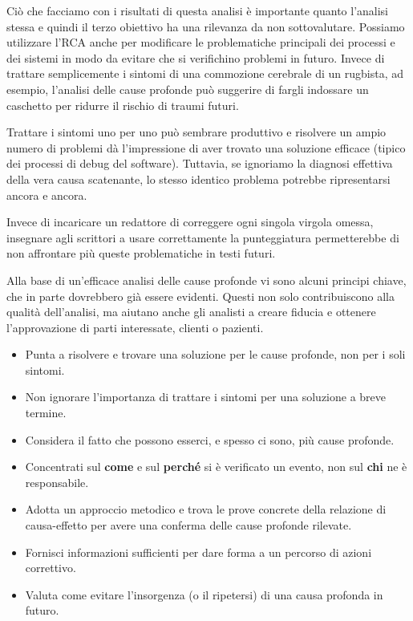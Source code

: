 Ciò che facciamo con i risultati di questa analisi è importante quanto l'analisi stessa e quindi il terzo obiettivo ha una rilevanza da non sottovalutare. Possiamo utilizzare l'RCA anche per modificare le problematiche principali dei processi e dei sistemi in modo da evitare che si verifichino problemi in futuro. Invece di trattare semplicemente i sintomi di una commozione cerebrale di un rugbista, ad esempio, l'analisi delle cause profonde può suggerire di fargli indossare un caschetto per ridurre il rischio di traumi futuri.

Trattare i sintomi uno per uno può sembrare produttivo e risolvere un ampio numero di problemi dà l'impressione di aver trovato una soluzione efficace (tipico dei processi di debug del software). Tuttavia, se ignoriamo la diagnosi effettiva della vera causa scatenante, lo stesso identico problema potrebbe ripresentarsi ancora e ancora. 

Invece di incaricare un redattore di correggere ogni singola virgola omessa, insegnare agli scrittori a usare correttamente la punteggiatura permetterebbe di non affrontare più queste problematiche in testi futuri.

Alla base di un'efficace analisi delle cause profonde vi sono alcuni principi chiave, che in parte dovrebbero già essere evidenti. Questi non solo contribuiscono alla qualità dell'analisi, ma aiutano anche gli analisti a creare fiducia e ottenere l'approvazione di parti interessate, clienti o pazienti.

\begin{itemize}
    \item Punta a risolvere e trovare una soluzione per le cause profonde, non per i soli sintomi.
    \item Non ignorare l'importanza di trattare i sintomi per una soluzione a breve termine.
    \item Considera il fatto che possono esserci, e spesso ci sono, più cause profonde.
	\item Concentrati sul \textbf{come} e sul \textbf{perché} si è verificato un evento, non sul \textbf{chi} ne è responsabile.
    \item Adotta un approccio metodico e trova le prove concrete della relazione di causa-effetto per avere una conferma delle cause profonde rilevate.
    \item Fornisci informazioni sufficienti per dare forma a un percorso di azioni correttivo.
    \item Valuta come evitare l'insorgenza (o il ripetersi) di una causa profonda in futuro.

\end{itemize}

